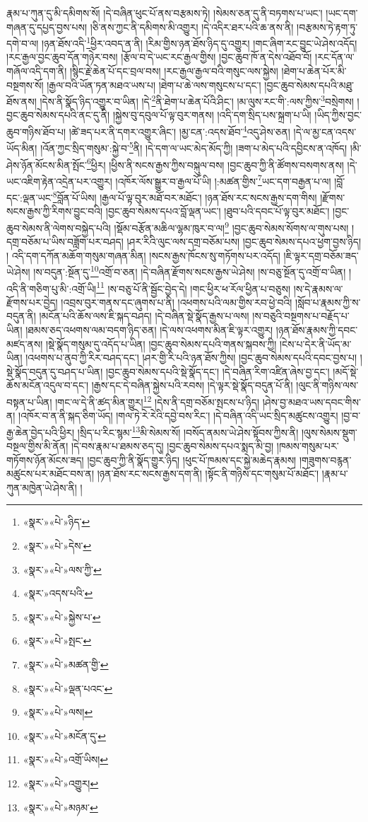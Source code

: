 རྣམ་པ་ཀུན་དུ་མི་དམིགས་སོ། །དེ་བཞིན་ཕུང་པོ་ནས་བརྩམས་ཏེ། །སེམས་ཅན་དུ་ནི་བཏགས་པ་ཡང་། །ཡང་དག་གཞན་དུ་དཔྱད་བྱས་པས། །ཅི་ནས་ཀྱང་ནི་དམིགས་མི་འགྱུར། །དེ་འདིར་ཐར་པའི་ཆ་ནས་ནི། །བརྩམས་ཏེ་རྟག་ཏུ་དགེ་བ་ལ། །ཉན་ཐོས་འདི་\footnote{«སྣར་»«པེ་»ཉིད་}ཕྱིར་འབད་ན་ནི། །རིམ་གྱིས་ཉན་ཐོས་ཉིད་དུ་འགྱུར། །གང་ཞིག་རང་བྱུང་ཡེ་ཤེས་འདོད། །རང་རྒྱལ་བྱང་ཆུབ་དོན་གཉེར་བས། །རྩོལ་བ་དེ་ཡང་རང་རྒྱལ་གྱིས། །བྱང་ཆུབ་ཁོ་ན་དེས་འཐོབ་བོ། །རང་དོན་ལ་གཞོལ་འདི་དག་ནི། །སྙིང་རྗེ་ཆེན་པོ་དང་བྲལ་བས། །རང་རྒྱལ་རྒྱལ་བའི་གསུང་ལས་སྐྱེས། །ཐེག་པ་ཆེན་པོར་མི་བསྔགས་སོ། །རྒྱལ་བའི་ཡོན་ཏན་མཐའ་ཡས་པ། །ཐེག་པ་ཆེ་ལས་གསུངས་པ་དང་། །བྱང་ཆུབ་སེམས་དཔའི་མཐུ་ཐོས་ནས། །དེས་ནི་སྣོད་ཉིད་འགྱུར་བ་ཡིན། །དེ་\footnote{«སྣར་»«པེ་»དེས་}ནི་ཐེག་པ་ཆེན་པོའི་ཤིང་། །མ་ལུས་རང་གི་:ལས་ཀྱིས་\footnote{«སྣར་»«པེ་»ལས་ཀྱི་}བསྲེགས། །བྱང་ཆུབ་སེམས་དཔའི་ནང་དུ་ནི། །སྐྱེས་བུ་དབུལ་པོ་ལྟ་བུར་གནས། །འདི་དག་སྲིད་པས་སྐྲག་པ་ཡི། །ཡིད་ཀྱིས་བྱང་ཆུབ་གཉིས་ཐོབ་པ། །ཚེ་ཟད་པར་ནི་དགར་འགྱུར་ཞིང་། །མྱ་ངན་:འདས་ཐོབ་\footnote{«སྣར་»འདས་པའི་}འདུ་ཤེས་ཅན། །དེ་ལ་མྱ་ངན་འདས་ཡོད་མིན། །འོན་ཀྱང་སྲིད་གསུམ་:སྐྱེ་བ་\footnote{«སྣར་»«པེ་»སྐྱེས་པ་}ནི། །དེ་དག་ལ་ཡང་མེད་མོད་ཀྱི། །ཟག་པ་མེད་པའི་དབྱིངས་ན་འཁོད། །མི་ཤེས་ཉོན་མོངས་མིན་སྤོང་\footnote{«སྣར་»«པེ་»སྤང་}ཕྱིར། །ཕྱིས་ནི་སངས་རྒྱས་ཀྱིས་བསྐུལ་བས། །བྱང་ཆུབ་ཀྱི་ནི་ཚོགས་བསགས་ནས། །དེ་ཡང་འཇིག་རྟེན་འདྲེན་པར་འགྱུར། །འཁོར་ལོས་སྒྱུར་བ་རྒྱལ་པོ་ཡི། །:མཚན་གྱིས་\footnote{«སྣར་»«པེ་»མཚན་གྱི་}ཡང་དག་བརྒྱན་པ་ལ། །བློ་དང་:ལྡན་ཡང་\footnote{«སྣར་»«པེ་»ལྡན་པའང་}བློན་པོ་ཡིས། །རྒྱལ་པོ་ལྟ་བུར་མཐོ་བར་མཐོང་། །ཉན་ཐོས་རང་སངས་རྒྱས་དག་གིས། །རྫོགས་སངས་རྒྱས་ཀྱི་རིགས་བྱུང་བའི། །བྱང་ཆུབ་སེམས་དཔའ་བློ་ལྡན་ཡང་། །ཐུབ་པའི་དབང་པོ་ལྟ་བུར་མཐོང་། །བྱང་ཆུབ་སེམས་ནི་ལེགས་བསྐྱེད་པའི། །སྡོམ་བརྩོན་མཆིལ་ལྷམ་ཁུར་བ་ལ།\footnote{«སྣར་»«པེ་»ལས།} །བྱང་ཆུབ་སེམས་སོགས་ལ་གུས་པས། །དགྲ་བཅོམ་པ་ཡིས་བཟློག་པར་བཤད། །ཤར་རིའི་ལུང་ལས་དགྲ་བཅོམ་པས། །བྱང་ཆུབ་སེམས་དཔའ་ཕྱག་བྱས་ཉིད། །
འདི་དག་དཀོན་མཆོག་གསུམ་གཞན་མིན། །སངས་རྒྱས་ཁོངས་སུ་གཏོགས་པར་འདོད། །ཇི་ལྟར་དགྲ་བཅོམ་ཟད་ཡེ་ཤེས། །ས་བདུན་:སྔོན་དུ་\footnote{«སྣར་»«པེ་»མངོན་དུ་}འགྲོ་བ་ཅན། །དེ་བཞིན་རྫོགས་སངས་རྒྱས་ཡེ་ཤེས། །ས་བཅུ་སྔོན་དུ་འགྲོ་བ་ཡིན། །འདི་ནི་གཅིག་པུ་མི་:འགྲོ་ཡི།\footnote{«སྣར་»«པེ་»འགྲོ་ཡིས།} །ས་བཅུ་པོ་ནི་སྦྱོང་བྱེད་དེ། །གང་ཕྱིར་ཕ་རོལ་ཕྱིན་པ་བཅུས། །ས་དེ་རྣམས་ལ་རྫོགས་པར་བྱེད། །འབྲས་བུར་གནས་དང་ཞུགས་པ་ནི། །འཕགས་པའི་ལམ་གྱིས་རབ་ཕྱེ་བའི། །སློབ་པ་རྣམས་ཀྱི་ས་བདུན་ནི། །མངོན་པའི་ཆོས་ལས་ཇི་སྐད་བཤད། །དེ་བཞིན་སྡེ་སྣོད་རྒྱས་པ་ལས། །ས་བཅུའི་བསྔགས་པ་བརྗོད་པ་ཡིན། །ཐམས་ཅད་འཕགས་ལམ་བདག་ཉིད་ཅན། །དེ་ལས་འཕགས་མིན་ཇི་ལྟར་འགྱུར། །ཉན་ཐོས་རྣམས་ཀྱི་དབང་མཛད་ནས། །སྡེ་སྣོད་གསུམ་དུ་འདོད་པ་ཡིན། །བྱང་ཆུབ་སེམས་དཔའི་གནས་སྐབས་ཀྱི། །ངེས་པ་དེར་ནི་ཡོད་མ་ཡིན། །འཕགས་པ་ནུབ་ཀྱི་རིར་བཤད་དང་། །ཤར་གྱི་རི་པའི་ཉན་ཐོས་ཀྱིས། །བྱང་ཆུབ་སེམས་དཔའི་དབང་བྱས་པ། །སྡེ་སྣོད་བདུན་དུ་བཤད་པ་ཡིན། །བྱང་ཆུབ་སེམས་དཔའི་སྡེ་སྣོད་དང་། །དེ་བཞིན་རིག་འཛིན་ཞེས་བྱ་དང་། །མདོ་སྡེ་ཆོས་མངོན་འདུལ་བ་དང་། །རྒྱས་དང་དེ་བཞིན་སྐྱེས་པའི་རབས། །དེ་ལྟར་སྡེ་སྣོད་བདུན་པོ་ནི། །ལུང་ནི་གཉིས་ལས་བསྟན་པ་ཡིན། །གང་ལ་དེ་ནི་ཚད་མིན་གྱུར།\footnote{«སྣར་»«པེ་»འགྱུར།} །དེས་ནི་དགྲ་བཅོམ་སྤངས་པ་ཉིད། །ཤེས་བྱ་མཐའ་ཡས་དབང་གིས་ན། །འཁོར་བ་ན་ནི་སྐད་ཅིག་ཡོད། །གལ་ཏེ་རེ་རེའི་དབྱེ་བས་རིང་། །དེ་བཞིན་འདི་ཡང་སྲིད་མཚུངས་འགྱུར། །བྱ་བ་རྒྱ་ཆེན་བྱེད་པའི་ཕྱིར། །སྲིད་པ་རིང་སྙམ་\footnote{«སྣར་»«པེ་»མཉམ་}མི་སེམས་སོ། །བསོད་ནམས་ཡེ་ཤེས་སྟོབས་ཀྱིས་ནི། །ལུས་སེམས་སྡུག་བསྔལ་གྱིས་མི་ནོན། །དེ་བས་རྣམ་པ་ཐམས་ཅད་དུ། །བྱང་ཆུབ་སེམས་དཔའ་སྨད་མི་བྱ། །ཁམས་གསུམ་པར་གཏོགས་ཉོན་མོངས་ཟད། །བྱང་ཆུབ་ཀྱི་ནི་སྣོད་གྱུར་ཉིད། །ཕུང་པོ་ཁམས་དང་སྐྱེ་མཆེད་རྣམས། །གཟུགས་བརྙན་མཚུངས་པར་མཐོང་བས་ན། །ཉན་ཐོས་རང་སངས་རྒྱས་དག་ནི། །སྟོང་ནི་གཉིས་དང་གསུམ་པོ་མཐོང་། །རྣམ་པ་ཀུན་མཁྱེན་ཡེ་ཤེས་ནི། །
